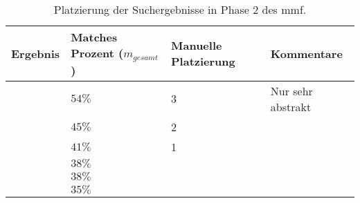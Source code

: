 \begin{table}[!h]
  \centering
  \begin{tabular}{m{2cm} m{4.3cm} m{4.3cm} m{2.5cm}}
    \toprule
    \textbf{Ergebnis} & \textbf{Matches Prozent ($m_{gesamt}$)} & \textbf{Manuelle Platzierung} & \textbf{Kommentare} \\ \midrule
    \cite{arh-result-no-filter-1} & $54\%$ & 3 & Nur sehr abstrakt \\ \hline
    \cite{arh-result-no-filter-3} & $45\%$& 2 & \\ \hline
    \cite{arh-result-no-filter-2} & $41\%$& 1 & \\ \hline
    \cite{arh-result-no-filter-4} & $38\%$& & \\ \hline
    \cite{arh-result-no-filter-5} & $38\%$& & \\ \hline
    \cite{arh-result-important-filter-4} & $35\%$& & \\
    \bottomrule
  \end{tabular}
  \caption[Platzierung der Suchergebnisse in Phase 2 des \gls{mmf}]{
   	Platzierung der Suchergebnisse in Phase 2 des \gls{mmf}.
  }
  \label{tab:phase2-ranking}
\end{table}
